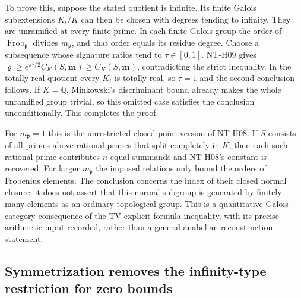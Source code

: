 \documentclass[11pt,a4paper]{article}
\begin{document}
To prove this, suppose the stated quotient is infinite.  Its finite
Galois subextensions $K_i/K$ can then be chosen with degrees tending
to infinity.  They are unramified at every finite prime.  In each
finite Galois group the order of
$\operatorname{Frob}_{\mathfrak p}$ divides
$m_{\mathfrak p}$, and that order equals its residue degree.
Choose a subsequence whose signature ratios tend to
$\tau\in[0,1]$.  NT-H09 gives
$\varrho\ge e^{\pi\tau/2}C_K(S,\boldsymbol m)
\ge C_K(S,\boldsymbol m)$, contradicting the strict inequality.
In the totally real quotient every $K_i$ is totally real, so
$\tau=1$ and the second conclusion follows.  If $K=\mathbb Q$,
Minkowski's discriminant bound already makes the whole unramified
group trivial, so this omitted case satisfies the conclusion
unconditionally.  This completes the proof.

For $m_{\mathfrak p}=1$ this is the unrestricted closed-point
version of NT-H08.  If $S$ consists of all primes above rational
primes that split completely in $K$, then each such rational prime
contributes $n$ equal summands and NT-H08's constant is recovered.
For larger $m_{\mathfrak p}$ the imposed relations only bound the
orders of Frobenius elements.  The conclusion concerns the index
of their closed normal closure; it does not assert that this normal
subgroup is generated by finitely many elements as an ordinary
topological group.  This is a quantitative Galois-category
consequence of the TV explicit-formula inequality, with its precise
arithmetic input recorded, rather than a general anabelian
reconstruction statement.

\subsection{Symmetrization removes the infinity-type restriction for zero bounds}
\end{document}
